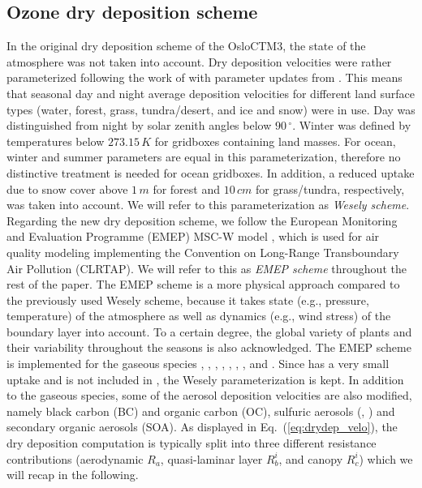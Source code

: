 \documentclass[gmd, manuscript]{copernicus}
\begin{document}
\subsection{Ozone dry deposition scheme}
\label{subsec:DryDep}
In the original dry deposition scheme of the OsloCTM3, the state of the atmosphere was not taken into account. Dry deposition velocities were rather parameterized following the work of \citet{AE:Wesely1989} with parameter updates from \citet{JGR:Hough1991}. This means that seasonal day and night average deposition velocities for different land surface types (water, forest, grass, tundra/desert, and ice and snow) were in use. Day was distinguished from night by solar zenith angles below $90\,\unit{^\circ}$. Winter was defined by temperatures below $273.15\,\unit{K}$ for gridboxes containing land masses. For ocean, winter and summer parameters are equal in this parameterization, therefore no distinctive treatment is needed for ocean gridboxes. In addition, a reduced uptake due to snow cover above $1\,\unit{m}$ for forest and $10\,\unit{cm}$ for grass/tundra, respectively, was taken into account. We will refer to this parameterization as \emph{Wesely scheme}.\\

Regarding the new dry deposition scheme, we follow the European Monitoring and Evaluation Programme (EMEP) MSC-W model \citep{WASP:Simpson2003,ACP:Simpson2012}, which is used for air quality modeling implementing the Convention on Long-Range Transboundary Air Pollution (CLRTAP). We will refer to this as \emph{EMEP scheme} throughout the rest of the paper. The EMEP scheme is a more physical approach compared to the previously used Wesely scheme, because it takes state (e.g., pressure, temperature)  of the atmosphere as well as dynamics (e.g., wind stress) of the boundary layer into account. To a certain degree, the global variety of plants and their variability throughout the seasons is also acknowledged. The EMEP scheme is implemented for the gaseous species , , , , , , , and . Since  has a very small uptake and is not included in \citet{WASP:Simpson2003,ACP:Simpson2012}, the Wesely parameterization is kept. In addition to the gaseous species, some of the aerosol deposition velocities are also modified, namely black carbon (BC) and organic carbon (OC), sulfuric aerosols (, ) and secondary organic aerosols (SOA). As displayed in Eq.~(\ref{eq:drydep_velo}), the dry deposition computation is typically split into three different resistance contributions (aerodynamic $R_a$, quasi-laminar layer $R^i_b$, and canopy $R^i_c$) which we will recap in the following.
\end{document}
